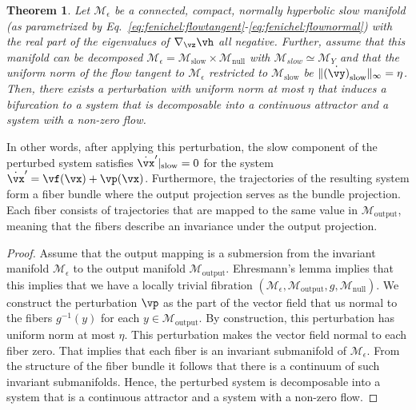 \documentclass{article} %
\newcounter{ct}
\newcommand{\manifold}{\mathcal{M}}
\newtheorem{theorem}{Theorem}
\theoremstyle{definition}
\theoremstyle{remark}
\begin{document}
\begin{theorem}\label{thrm:near_ca}
Let \(\manifold_{\epsilon}\) be a connected, compact, normally hyperbolic slow manifold  (as parametrized by Eq.~\eqref{eq:fenichel:flowtangent}-\eqref{eq:fenichel:flownormal}) with the real part of the eigenvalues of \(\nabla_{\vz} \vh\) all negative. %
Further, assume that this manifold can be decomposed \(\manifold_{\epsilon}= \manifold_{\text{slow}}\times \manifold_{\text{null}}\) with \(\manifold_{slow}\simeq \manifold_{Y}\) and that
 the uniform norm of the flow tangent to \(\manifold_{\epsilon}\) restricted to \(\manifold_{\text{slow}}\) be \(\|\dot{(\vy)}_{\text{slow}}\|_{\infty}=\eta\).
Then, there exists a perturbation with uniform norm at most \(\eta\) that induces a bifurcation to a system that is decomposable into a continuous attractor and a system with a non-zero flow.
\end{theorem}

In other words, after applying this perturbation, the slow component of the perturbed system satisfies \(\dot{\vx}'|_{\text{slow}} = 0\) for the system \(\dot{\vx}' = \vf(\vx) + \vp(\vx)\).
Furthermore, the trajectories of the resulting system form a fiber bundle where the output projection serves as the bundle projection.
Each fiber consists of trajectories that are mapped to the same value in \(\manifold_{\text{output}}\), meaning that the fibers describe an invariance under the output projection. %


\begin{proof}
Assume that the output mapping is a submersion from the invariant manifold \(\manifold_{\epsilon}\) to the output manifold \(\manifold_{\text{output}}\).
Ehresmann's lemma implies that this implies that we have a locally trivial fibration \((\manifold_{\epsilon}, \manifold_{\text{output}}, g,\manifold_{\text{null}})\).
We construct the perturbation \(\vp\) as the part of the vector field that us normal to the fibers \(g^{-1}(y)\) for each \(y\in\manifold_{\text{output}}\).
By construction, this perturbation has uniform norm at most \(\eta\).
This perturbation makes the vector field normal to each fiber zero.
That implies that each fiber is an invariant submanifold of \(\manifold_{\epsilon}\).
From the structure of the fiber bundle it follows that there is a continuum of such invariant submanifolds.
Hence, the perturbed system is decomposable into a system that is a continuous attractor and a system with a non-zero flow.
\end{proof}
\end{document}
